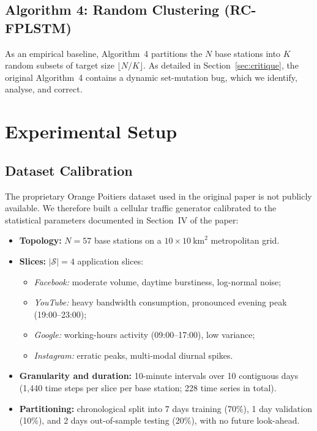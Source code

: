 \documentclass[11pt,a4paper]{article}
\begin{document}
\subsection{Algorithm 4: Random Clustering (RC-FPLSTM)}
As an empirical baseline, Algorithm~4 partitions the $N$ base stations into $K$ random subsets of target size $\lfloor N / K \rfloor$. As detailed in Section~\ref{sec:critique}, the original Algorithm~4 contains a dynamic set-mutation bug, which we identify, analyse, and correct.

\section{Experimental Setup}

\subsection{Dataset Calibration}
The proprietary Orange Poitiers dataset used in the original paper is not publicly available. We therefore built a cellular traffic generator calibrated to the statistical parameters documented in Section~IV of the paper:
\begin{itemize}
    \item \textbf{Topology:} $N = 57$ base stations on a $10 \times 10\ \text{km}^2$ metropolitan grid.
    \item \textbf{Slices:} $|\mathcal{S}| = 4$ application slices:
    \begin{itemize}
        \item \textit{Facebook:} moderate volume, daytime burstiness, log-normal noise;
        \item \textit{YouTube:} heavy bandwidth consumption, pronounced evening peak (19:00--23:00);
        \item \textit{Google:} working-hours activity (09:00--17:00), low variance;
        \item \textit{Instagram:} erratic peaks, multi-modal diurnal spikes.
    \end{itemize}
    \item \textbf{Granularity and duration:} 10-minute intervals over 10 contiguous days (1,440 time steps per slice per base station; 228 time series in total).
    \item \textbf{Partitioning:} chronological split into 7 days training (70\%), 1 day validation (10\%), and 2 days out-of-sample testing (20\%), with no future look-ahead.
\end{itemize}
\end{document}
